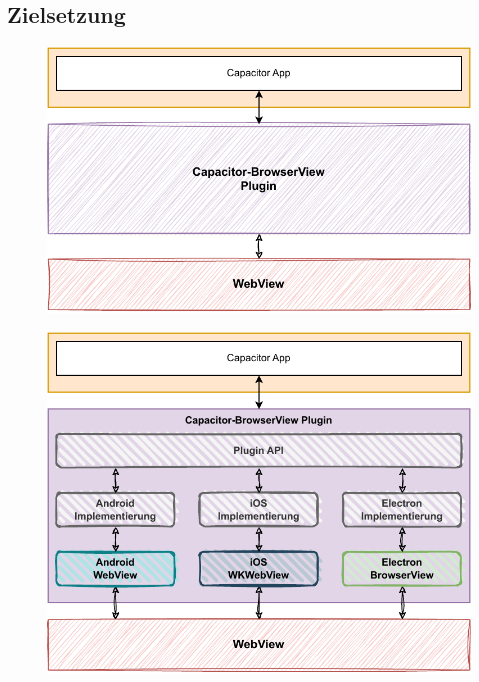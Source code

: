 \subsection{Zielsetzung}

\begin{figure}[H]
    \centering
    \includegraphics[width=\textwidth]{assets/03_Capacitor-BrowserView/01_Zielsetzung.drawio.pdf}
\end{figure}

\begin{figure}[H]
    \centering
    \includegraphics[width=\textwidth]{assets/03_Capacitor-BrowserView/02_Zielsetzung+Libraries.drawio.pdf}
\end{figure}


\clearpage
